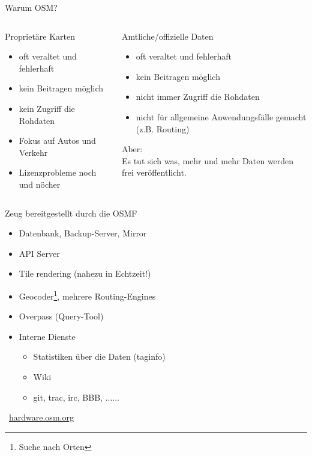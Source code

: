 \documentclass{beamer}
\begin{document}
			\begin{frame}{Warum OSM?}
				\begin{columns}[t]
					\begin{column}{0.5\textwidth}
						Proprietäre Karten\pause
						\begin{itemize}
							\item oft veraltet und fehlerhaft\pause
							\item kein Beitragen möglich\pause
							\item kein Zugriff die Rohdaten\pause
							\item Fokus auf Autos und Verkehr\pause
							\item Lizenzprobleme noch und nöcher
						\end{itemize}
					\end{column}
					\pause
					\begin{column}{0.5\textwidth}
						Amtliche/offizielle Daten\pause
						\begin{itemize}
							\item oft veraltet und fehlerhaft\pause
							\item kein Beitragen möglich\pause
							\item nicht immer Zugriff die Rohdaten\pause
							\item nicht für allgemeine Anwendungsfälle gemacht (z.B. Routing)
						\end{itemize}
						\pause
						Aber:\\
						Es tut sich was, mehr und mehr Daten werden frei veröffentlicht.
					\end{column}
				\end{columns}
			\end{frame}
			
			\begin{frame}{Zeug bereitgestellt durch die OSMF}
				\begin{itemize}
					\item Datenbank, Backup-Server, Mirror
					\item API Server
					\item Tile rendering (nahezu in Echtzeit!)
					\pause
					\item Geocoder\footnote{Suche nach Orten}, mehrere Routing-Engines
					\item Overpass (Query-Tool)
					\pause
					\item Interne Dienste
					\begin{itemize}
						\item Statistiken über die Daten (taginfo)
						\item Wiki
						\item git, trac, irc, BBB, ......
					\end{itemize}
				\end{itemize}
				\pause
				\textrightarrow\ \href{https://hardware.openstreetmap.org/}{hardware.osm.org}
			\end{frame}
			
\end{document}
